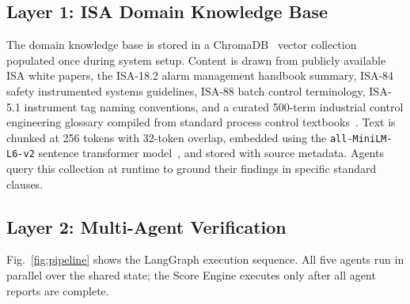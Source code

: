 \documentclass[journal]{IEEEtran}
\begin{document}
\subsection{Layer 1: ISA Domain Knowledge Base}

The domain knowledge base is stored in a ChromaDB~\cite{chromadb} vector
collection populated once during system setup. Content is drawn from publicly
available ISA white papers, the ISA-18.2 alarm management handbook summary,
ISA-84 safety instrumented systems guidelines, ISA-88 batch control terminology,
ISA-5.1 instrument tag naming conventions, and a curated 500-term industrial
control engineering glossary compiled from standard process control
textbooks~\cite{seborg2016}. Text is chunked at 256 tokens with 32-token
overlap, embedded using the \texttt{all-MiniLM-L6-v2} sentence transformer
model~\cite{reimers2019}, and stored with source metadata. Agents query this
collection at runtime to ground their findings in specific standard clauses.

\subsection{Layer 2: Multi-Agent Verification}
\label{subsec:agents}

Fig.~\ref{fig:pipeline} shows the LangGraph execution sequence. All five agents
run in parallel over the shared state; the Score Engine executes only after all
agent reports are complete.
\end{document}
